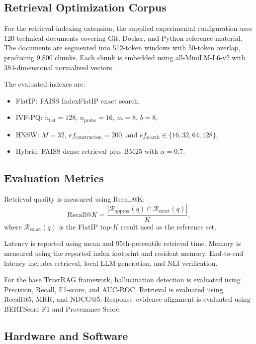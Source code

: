 \documentclass[conference]{IEEEtran}
\begin{document}
\subsection{Retrieval Optimization Corpus}

For the retrieval-indexing extension, the supplied experimental configuration uses 120 technical documents covering Git, Docker, and Python reference material. The documents are segmented into 512-token windows with 50-token overlap, producing 9,800 chunks. Each chunk is embedded using all-MiniLM-L6-v2 with 384-dimensional normalized vectors.

The evaluated indexes are:
\begin{itemize}
    \item FlatIP: FAISS IndexFlatIP exact search,
    \item IVF-PQ: $n_{\mathrm{list}}=128$, $n_{\mathrm{probe}}=16$, $m=8$, $b=8$,
    \item HNSW: $M=32$, $ef_{\mathrm{construction}}=200$, and $ef_{\mathrm{search}}\in\{16,32,64,128\}$,
    \item Hybrid: FAISS dense retrieval plus BM25 with $\alpha=0.7$.
\end{itemize}

\subsection{Evaluation Metrics}

Retrieval quality is measured using Recall@K:
\begin{equation}
\mathrm{Recall@}K=
\frac{|\mathcal{R}_{\mathrm{approx}}(q)
\cap
\mathcal{R}_{\mathrm{exact}}(q)|}{K},
\end{equation}
where $\mathcal{R}_{\mathrm{exact}}(q)$ is the FlatIP top-$K$ result used as the reference set.

Latency is reported using mean and 95th-percentile retrieval time. Memory is measured using the reported index footprint and resident memory. End-to-end latency includes retrieval, local LLM generation, and NLI verification.

For the base TrustRAG framework, hallucination detection is evaluated using Precision, Recall, F1-score, and AUC-ROC. Retrieval is evaluated using Recall@5, MRR, and NDCG@5. Response--evidence alignment is evaluated using BERTScore F1 and Provenance Score.

\subsection{Hardware and Software}
\end{document}
